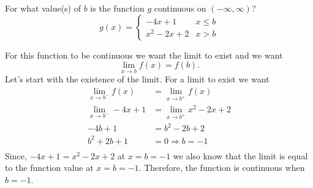 \documentclass{hwset}
\begin{document}
\begin{problem}[4.] For what value(s) of $b$ is the function $g$ continuous
on $(-\infty,\infty)$?
	\begin{equation*}
		g(x)=\begin{cases} 
			-4x+1 & x\leq b \\
				x^2-2x+2 & x>b
			\end{cases}
	\end{equation*}
\end{problem}

\begin{solution}
	For this function to be continuous we want the limit to exist and we want
	\begin{equation*}
		\lim_{x\to b} f(x) = f(b).
	\end{equation*}
	Let's start with the existence of the limit. For a limit to exist we want
	\begin{align*}
		\lim_{x\to b^-} f(x) &= \lim_{x\to b^+} f(x) \\
		\lim_{x\to b^-} -4x+1 &= \lim_{x\to b^+} x^2-2x+2 \\
		-4b+1 &= b^2-2b+2 \\
		b^2+2b+1 &= 0 \Rightarrow \boxed{b=-1}\\
	\end{align*}
	Since, $-4x +1 = x^2-2x +2$ at $x=b=-1$ we also know that the limit is equal to
	the function value at $x=b=-1$. Therefore, the function is continuous when
	$b=-1$.
\end{solution}
\end{document}
